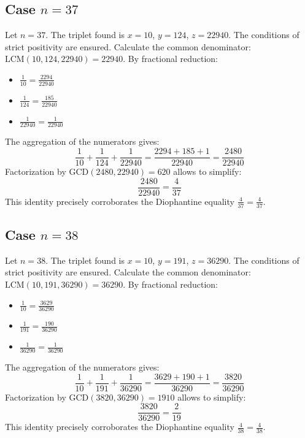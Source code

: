 \documentclass[11pt,a4paper]{article}
\begin{document}
\subsection{Case $n = 37$}
Let $n = 37$. The triplet found is $x = 10$, $y = 124$, $z = 22940$.
The conditions of strict positivity are ensured.
Calculate the common denominator: $\text{LCM}(10, 124, 22940) = 22940$.
By fractional reduction:
\begin{itemize}
    \item $\frac{1}{10} = \frac{2294}{22940}$
    \item $\frac{1}{124} = \frac{185}{22940}$
    \item $\frac{1}{22940} = \frac{1}{22940}$
\end{itemize}
The aggregation of the numerators gives:
$$ \frac{1}{10} + \frac{1}{124} + \frac{1}{22940} = \frac{2294 + 185 + 1}{22940} = \frac{2480}{22940} $$
Factorization by $\text{GCD}(2480, 22940) = 620$ allows to simplify:
$$ \frac{2480}{22940} = \frac{4}{37} $$
This identity precisely corroborates the Diophantine equality $\frac{4}{37} = \frac{4}{37}$.

\subsection{Case $n = 38$}
Let $n = 38$. The triplet found is $x = 10$, $y = 191$, $z = 36290$.
The conditions of strict positivity are ensured.
Calculate the common denominator: $\text{LCM}(10, 191, 36290) = 36290$.
By fractional reduction:
\begin{itemize}
    \item $\frac{1}{10} = \frac{3629}{36290}$
    \item $\frac{1}{191} = \frac{190}{36290}$
    \item $\frac{1}{36290} = \frac{1}{36290}$
\end{itemize}
The aggregation of the numerators gives:
$$ \frac{1}{10} + \frac{1}{191} + \frac{1}{36290} = \frac{3629 + 190 + 1}{36290} = \frac{3820}{36290} $$
Factorization by $\text{GCD}(3820, 36290) = 1910$ allows to simplify:
$$ \frac{3820}{36290} = \frac{2}{19} $$
This identity precisely corroborates the Diophantine equality $\frac{4}{38} = \frac{4}{38}$.
\end{document}
